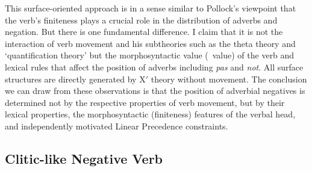 \documentclass[output=paper]{langsci/langscibook}
\begin{document}
{\begin{exe}
\begin{xlist}
\begin{exe}
\begin{xlist}
This surface-oriented approach is in a sense similar to
Pollock's viewpoint that the verb's finiteness plays a
crucial role in the distribution of adverbs and negation. But
there is one fundamental difference. I claim that it is not the interaction
of verb movement and his subtheories  such as the theta theory
and `quantification theory'  but the morphosyntactic value (\VFORM\
value) of the verb and lexical rules that affect the position of
adverbs including \emph{pas} and \emph{not}. All surface structures are directly
generated by X$'$ theory without movement. The conclusion we can draw from these observations
is that the position of adverbial negatives is determined not by
the respective
properties of verb movement, but by their lexical
properties, the morphosyntactic (finiteness) features of the verbal head,
and independently motivated Linear Precedence constraints.



%




%



\subsection{Clitic-like Negative Verb}


\end{xlist}
\end{exe}
\end{xlist}
\end{exe}}
\end{document}
